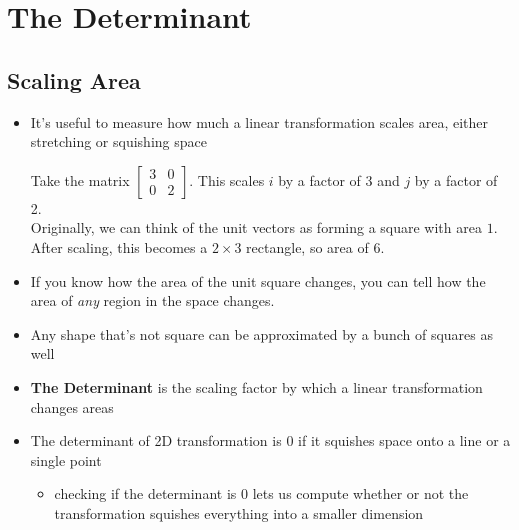 \section{The Determinant}
\subsection{Scaling Area}
\begin{itemize}
    \item It's useful to measure how much a linear transformation scales area, either stretching or squishing space
    \begin{example}
        Take the matrix $\begin{bmatrix} 3 & 0 \\ 0 & 2 \end{bmatrix}$. This scales $i$ by a factor of $3$ and $j$ by a factor of 2.\\
        Originally, we can think of the unit vectors as forming a square with area $1$. \\
        After scaling, this becomes a $ 2 \times 3 $ rectangle, so area of 6.
    \end{example}
    \item If you know how the area of the unit square changes, you can tell how the area of \textit{any} region in the space changes.
    \item Any shape that's not square can be approximated by a bunch of squares as well
    \item \textbf{The Determinant} is the scaling factor by which a linear transformation changes areas
    \item The determinant of 2D transformation is 0 if it squishes space onto a line or a single point
    \begin{itemize}
        \item checking if the determinant is 0 lets us compute whether or not the transformation squishes everything into a smaller dimension
    \end{itemize}
\end{itemize}

